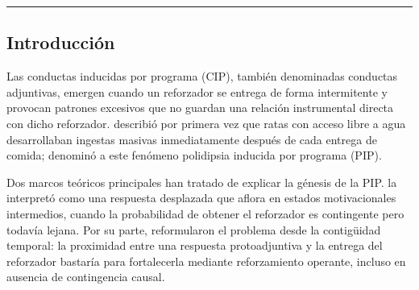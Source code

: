 \documentclass[12pt,a4paper]{article}
\begin{document}
    \vspace{3mm}
    
    \begin{center}
    \textcolor{azul}{\rule{150mm}{0.5mm}}
    \end{center}
       

\vspace{15mm}

\begin{multicols}{2}

\section{Introducción}

Las conductas inducidas por programa (CIP), también denominadas conductas adjuntivas, emergen cuando un reforzador se entrega de forma intermitente y provocan patrones excesivos que no guardan una relación instrumental directa con dicho reforzador. \citet{Falk1961} describió por primera vez que ratas con acceso libre a agua desarrollaban ingestas masivas inmediatamente después de cada entrega de comida; denominó a este fenómeno polidipsia inducida por programa (PIP).

Dos marcos teóricos principales han tratado de explicar la génesis de la PIP. \citet{Staddon1977} la interpretó como una respuesta desplazada que aflora en estados motivacionales intermedios, cuando la probabilidad de obtener el reforzador es contingente pero todavía lejana. Por su parte, \citet{Killeen2013} reformularon el problema desde la contigüidad temporal: la proximidad entre una respuesta protoadjuntiva y la entrega del reforzador bastaría para fortalecerla mediante reforzamiento operante, incluso en ausencia de contingencia causal.


\end{multicols}
\end{document}
